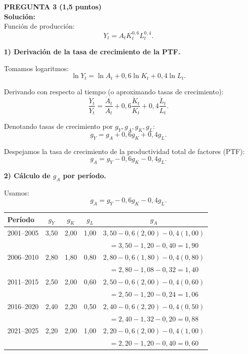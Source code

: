 \documentclass[11pt,addpoints]{article}
\begin{document}
\textbf{PREGUNTA 3 (1,5 puntos)}\\
\textbf{Solución:}\\

Función de producción:
\[
Y_t = A_t K_t^{0{,}6} L_t^{0{,}4}.
\]

\textbf{1) Derivación de la tasa de crecimiento de la PTF.}

Tomamos logaritmos:
\[
\ln Y_t = \ln A_t + 0{,}6 \ln K_t + 0{,}4 \ln L_t.
\]

Derivando con respecto al tiempo (o aproximando tasas de crecimiento):
\[
\frac{\dot Y_t}{Y_t}
= \frac{\dot A_t}{A_t} + 0{,}6\frac{\dot K_t}{K_t} + 0{,}4\frac{\dot L_t}{L_t}.
\]

\newpage
\vspace*{0.5cm}
Denotando tasas de crecimiento por $g_Y, g_A, g_K, g_L$:
\[
g_Y = g_A + 0{,}6g_K + 0{,}4g_L.
\]

Despejamos la tasa de crecimiento de la productividad total de factores (PTF):
\[
\boxed{g_A = g_Y - 0{,}6g_K - 0{,}4g_L}.
\]

\medskip
\textbf{2) Cálculo de $g_A$ por período.}

Usamos:
\[
g_A = g_Y - 0{,}6g_K - 0{,}4g_L.
\]

\begin{center}
\begin{tabular}{lcccc}
\toprule
\textbf{Período} & $g_Y$ & $g_K$ & $g_L$ & $g_A$ \\ \midrule
2001–2005 & 3{,}50 & 2{,}00 & 1{,}00 & $3{,}50 - 0{,}6(2{,}00) - 0{,}4(1{,}00)$ \\
&&&& $= 3{,}50 - 1{,}20 - 0{,}40 = 1{,}90$ \\[0.1cm]
2006–2010 & 2{,}80 & 1{,}80 & 0{,}80 & $2{,}80 - 0{,}6(1{,}80) - 0{,}4(0{,}80)$ \\
&&&& $= 2{,}80 - 1{,}08 - 0{,}32 = 1{,}40$ \\[0.1cm]
2011–2015 & 2{,}50 & 2{,}00 & 0{,}60 & $2{,}50 - 0{,}6(2{,}00) - 0{,}4(0{,}60)$ \\
&&&& $= 2{,}50 - 1{,}20 - 0{,}24 = 1{,}06$ \\[0.1cm]
2016–2020 & 2{,}40 & 2{,}20 & 0{,}50 & $2{,}40 - 0{,}6(2{,}20) - 0{,}4(0{,}50)$\\
&&&& $= 2{,}40 - 1{,}32 - 0{,}20 = 0{,}88$ \\[0.1cm]
2021–2025 & 2{,}20 & 2{,}00 & 1{,}00 & $2{,}20 - 0{,}6(2{,}00) - 0{,}4(1{,}00)$\\
&&&& $= 2{,}20 - 1{,}20 - 0{,}40 = 0{,}60$ \\
\bottomrule
\end{tabular}
\end{center}
\end{document}
